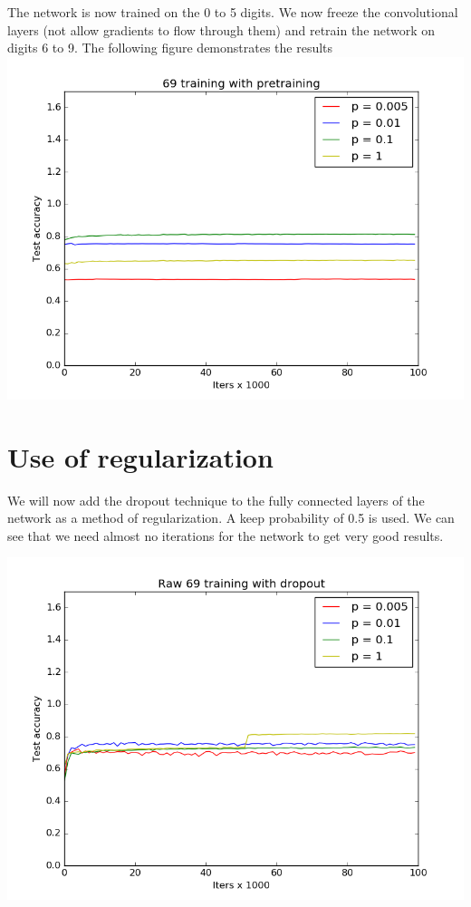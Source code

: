 \documentclass[11pt]{article}
\begin{document}
The network is now trained on the 0 to 5 digits. We now freeze the convolutional layers (not allow gradients to flow through them) and retrain the network on digits 6 to 9. The following figure demonstrates the results \\ 


\includegraphics[width=\textwidth]{69trainingwithpretraining}

\section{Use of regularization}
We will now add the dropout technique to the fully connected layers of the network as a method of regularization.
A keep probability of 0.5 is used. We can see that we need almost no iterations for the network to get very good results.

\includegraphics[width=\textwidth]{Raw69trainingwithdropout}
\end{document}
